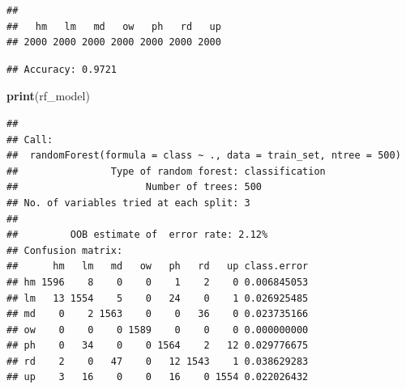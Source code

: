 \documentclass[
]{article}
\newenvironment{Shaded}{\begin{snugshade}}{\end{snugshade}}
\newcommand{\AttributeTok}[1]{\textcolor[rgb]{0.13,0.29,0.53}{#1}}
\newcommand{\CommentTok}[1]{\textcolor[rgb]{0.56,0.35,0.01}{\textit{#1}}}
\newcommand{\DecValTok}[1]{\textcolor[rgb]{0.00,0.00,0.81}{#1}}
\newcommand{\FloatTok}[1]{\textcolor[rgb]{0.00,0.00,0.81}{#1}}
\newcommand{\FunctionTok}[1]{\textcolor[rgb]{0.13,0.29,0.53}{\textbf{#1}}}
\newcommand{\NormalTok}[1]{#1}
\newcommand{\OtherTok}[1]{\textcolor[rgb]{0.56,0.35,0.01}{#1}}
\newcommand{\SpecialCharTok}[1]{\textcolor[rgb]{0.81,0.36,0.00}{\textbf{#1}}}
\newcommand{\StringTok}[1]{\textcolor[rgb]{0.31,0.60,0.02}{#1}}
\begin{document}
\begin{verbatim}
## 
##   hm   lm   md   ow   ph   rd   up 
## 2000 2000 2000 2000 2000 2000 2000
\end{verbatim}

\begin{Shaded}
\end{Shaded}

\begin{verbatim}
## Accuracy: 0.9721
\end{verbatim}

\begin{Shaded}
\begin{Highlighting}[]
\FunctionTok{print}\NormalTok{(rf\_model)}
\end{Highlighting}
\end{Shaded}

\begin{verbatim}
## 
## Call:
##  randomForest(formula = class ~ ., data = train_set, ntree = 500) 
##                Type of random forest: classification
##                      Number of trees: 500
## No. of variables tried at each split: 3
## 
##         OOB estimate of  error rate: 2.12%
## Confusion matrix:
##      hm   lm   md   ow   ph   rd   up class.error
## hm 1596    8    0    0    1    2    0 0.006845053
## lm   13 1554    5    0   24    0    1 0.026925485
## md    0    2 1563    0    0   36    0 0.023735166
## ow    0    0    0 1589    0    0    0 0.000000000
## ph    0   34    0    0 1564    2   12 0.029776675
## rd    2    0   47    0   12 1543    1 0.038629283
## up    3   16    0    0   16    0 1554 0.022026432
\end{verbatim}
\end{document}
